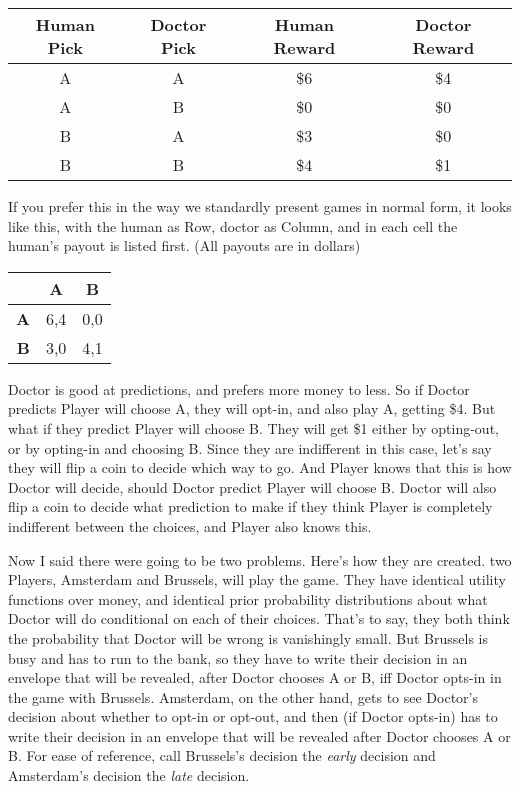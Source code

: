 \documentclass[
  12pt,
]{article}
\begin{document}
\begin{longtable}[]{@{}cccc@{}}
\toprule
Human Pick & Doctor Pick & Human Reward & Doctor Reward \\
\midrule
\endhead
A & A & \$6 & \$4 \\
A & B & \$0 & \$0 \\
B & A & \$3 & \$0 \\
B & B & \$4 & \$1 \\
\bottomrule
\end{longtable}

If you prefer this in the way we standardly present games in normal
form, it looks like this, with the human as Row, doctor as Column, and
in each cell the human's payout is listed first. (All payouts are in
dollars)

\begin{table}[H]
\centering
\begin{tabular}[t]{>{}r|cc}

\textbf{ } & \textbf{A} & \textbf{B}\\
\midrule
\textbf{A} & 6,4 & 0,0\\
\textbf{B} & 3,0 & 4,1\\

\end{tabular}
\end{table}

Doctor is good at predictions, and prefers more money to less. So if
Doctor predicts Player will choose A, they will opt-in, and also play A,
getting \$4. But what if they predict Player will choose B. They will
get \$1 either by opting-out, or by opting-in and choosing B. Since they
are indifferent in this case, let's say they will flip a coin to decide
which way to go. And Player knows that this is how Doctor will decide,
should Doctor predict Player will choose B. Doctor will also flip a coin
to decide what prediction to make if they think Player is completely
indifferent between the choices, and Player also knows this.

Now I said there were going to be two problems. Here's how they are
created. two Players, Amsterdam and Brussels, will play the game. They
have identical utility functions over money, and identical prior
probability distributions about what Doctor will do conditional on each
of their choices. That's to say, they both think the probability that
Doctor will be wrong is vanishingly small. But Brussels is busy and has
to run to the bank, so they have to write their decision in an envelope
that will be revealed, after Doctor chooses A or B, iff Doctor opts-in
in the game with Brussels. Amsterdam, on the other hand, gets to see
Doctor's decision about whether to opt-in or opt-out, and then (if
Doctor opts-in) has to write their decision in an envelope that will be
revealed after Doctor chooses A or B. For ease of reference, call
Brussels's decision the \emph{early} decision and Amsterdam's decision
the \emph{late} decision.
\end{document}
